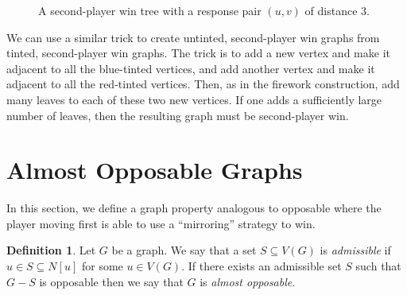 \documentclass[11pt]{article}
\theoremstyle{definition}
\newtheorem{definition}[theorem]{Definition}
\begin{document}
\begin{figure}
    \centering
    \caption{A second-player win tree with a response pair $(u,v)$ of distance
    3.}
    \label{fig:response-pair-tree}
\end{figure}

We can use a similar trick to create untinted, second-player win graphs from
tinted, second-player win graphs. The trick is to add a new vertex and make it
adjacent to all the blue-tinted vertices, and add another vertex and make it
adjacent to all the red-tinted vertices. Then, as in the firework construction,
add many leaves to each of these two new vertices. If one adds a sufficiently
large number of leaves, then the resulting graph must be second-player win. 

\section{Almost Opposable Graphs}
\label{sec: almost opposable graphs}

In this section, we define a graph property analogous to opposable where the
player moving first is able to use a ``mirroring'' strategy to win. 

\begin{definition}
    \label{def: almost opposable}
    Let $G$ be a graph. We say that a set $S\subseteq V(G)$ is
    \emph{admissible} if $u\in S\subseteq N[u]$ for some $u\in V(G)$. If there
    exists an admissible set $S$ such that $G-S$ is opposable then we say that
    $G$ is \emph{almost opposable}.
\end{definition}
\end{document}
